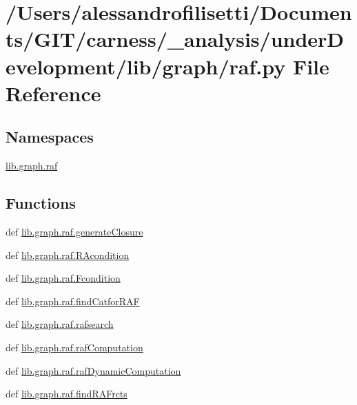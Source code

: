 \hypertarget{a00055}{\section{/\-Users/alessandrofilisetti/\-Documents/\-G\-I\-T/carness/\-\_\-analysis/under\-Development/lib/graph/raf.py File Reference}
\label{a00055}
}
\subsection*{Namespaces}
\begin{DoxyCompactItemize}
\item 
\hyperlink{a00113}{lib.\-graph.\-raf}
\end{DoxyCompactItemize}
\subsection*{Functions}
\begin{DoxyCompactItemize}
\item 
def \hyperlink{a00113_a56510e9067d8a6c8f90847d6656ce709}{lib.\-graph.\-raf.\-generate\-Closure}
\item 
def \hyperlink{a00113_a9896a4198e08978afb80e86697f1bbd0}{lib.\-graph.\-raf.\-R\-Acondition}
\item 
def \hyperlink{a00113_a160a90fb55ff323fc86fcdc65b30b90f}{lib.\-graph.\-raf.\-Fcondition}
\item 
def \hyperlink{a00113_aaeb3a479f24daf493cc7052aef879d2c}{lib.\-graph.\-raf.\-find\-Catfor\-R\-A\-F}
\item 
def \hyperlink{a00113_a532a434a0b2fe187a3ff5a8319e4e3b4}{lib.\-graph.\-raf.\-rafsearch}
\item 
def \hyperlink{a00113_a3c9606e9d3274506955225eacf05877e}{lib.\-graph.\-raf.\-raf\-Computation}
\item 
def \hyperlink{a00113_a0b49d65e78e62c4ddd5022d4405f8286}{lib.\-graph.\-raf.\-raf\-Dynamic\-Computation}
\item 
def \hyperlink{a00113_aa4fb376eecb97a88efdb35aa15466c3b}{lib.\-graph.\-raf.\-find\-R\-A\-Frcts}
\end{DoxyCompactItemize}
